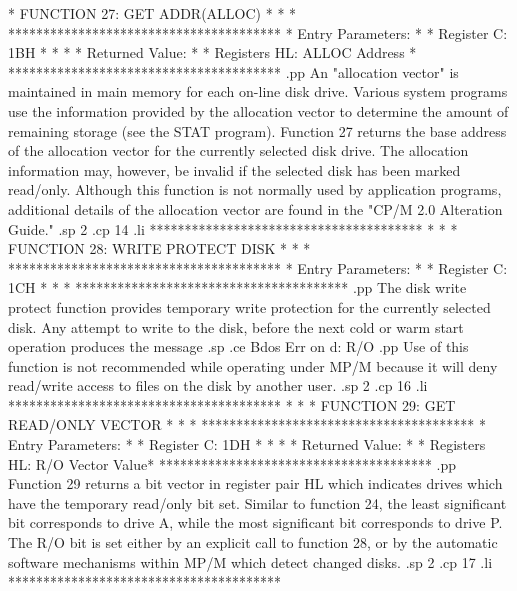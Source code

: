 *  FUNCTION 27: GET ADDR(ALLOC)       *
*                                     *
***************************************
*  Entry Parameters:                  *
*      Register   C:  1BH             *
*                                     *
*  Returned   Value:                  *
*      Registers HL:  ALLOC Address   *
***************************************
.pp
An "allocation vector" is maintained in main memory for each
on-line disk drive.  Various system programs use the
information provided by the allocation vector to determine
the amount of remaining storage (see the STAT program).
Function 27 returns the base address of the allocation
vector for the currently selected disk drive.
The allocation information may, however, be invalid if
the selected disk has been marked read/only.
Although this function is not normally used by application
programs, additional details of the allocation vector
are found in the "CP/M 2.0 Alteration Guide."
.sp 2
.cp 14
.li
***************************************
*                                     *
*  FUNCTION 28: WRITE PROTECT DISK    *
*                                     *
***************************************
*  Entry Parameters:                  *
*      Register   C:  1CH             *
*                                     *
***************************************
.pp
The disk write protect function provides temporary write
protection for the currently selected disk.  Any attempt
to write to the disk, before the next cold or warm start
operation produces the message
.sp
.ce
Bdos Err on d: R/O
.pp
Use of this function is not recommended while operating under
MP/M because it will deny read/write access to files on the
disk by another user.
.sp 2
.cp 16
.li
***************************************
*                                     *
*  FUNCTION 29: GET READ/ONLY VECTOR  *
*                                     *
***************************************
*  Entry Parameters:                  *
*      Register   C:  1DH             *
*                                     *
*  Returned   Value:                  *
*      Registers HL:  R/O Vector Value*
***************************************
.pp
Function 29 returns a bit vector in register pair HL which
indicates drives which have the temporary read/only bit set.
Similar to function 24, the least significant bit corresponds
to drive A, while the most significant bit corresponds to
drive P.
The R/O
bit is set either by an explicit call to function 28, or
by the automatic software mechanisms within MP/M which
detect changed disks.
.sp 2
.cp 17
.li
***************************************
